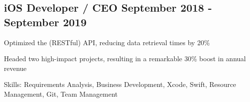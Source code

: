 \subsection{{iOS Developer / CEO \hfill September 2018 - September 2019}}
\begin{zitemize}
\setlength\itemsep{0.5em}

\item Optimized the (RESTful) API, reducing data retrieval times by 20\%

\item Headed two high-impact projects, resulting in a remarkable 30\% boost in annual revenue

\item[] Skills: Requirements Analysis, Business Development, Xcode, Swift, Resource Management, Git, Team Management

\end{zitemize}